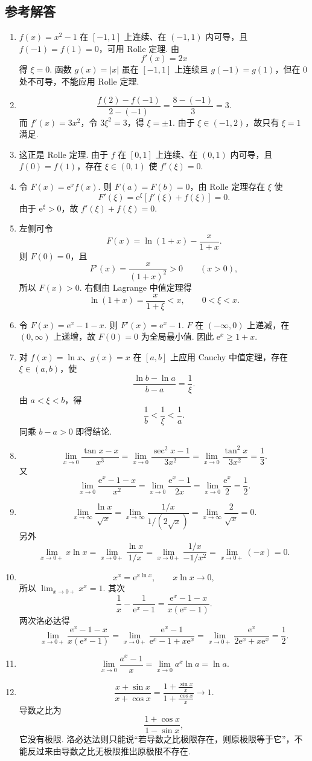 \documentclass[fontset=fandol]{ctexart}
\newcommand{\ee}{\mathrm{e}}
\begin{document}
\subsection{参考解答}
\begin{enumerate}[label=\textbf{练习\arabic*.},leftmargin=2.2em]
\item $f(x)=x^2-1$ 在 $[-1,1]$ 上连续、在 $(-1,1)$ 内可导，且 $f(-1)=f(1)=0$，可用 Rolle 定理. 由
\[
f'(x)=2x
\]
得 $\xi=0$. 函数 $g(x)=|x|$ 虽在 $[-1,1]$ 上连续且 $g(-1)=g(1)$，但在 $0$ 处不可导，不能应用 Rolle 定理.
\item
\[
\frac{f(2)-f(-1)}{2-(-1)}=\frac{8-(-1)}{3}=3.
\]
而 $f'(x)=3x^2$，令 $3\xi^2=3$，得 $\xi=\pm1$. 由于 $\xi\in(-1,2)$，故只有 $\xi=1$ 满足.
\item 这正是 Rolle 定理. 由于 $f$ 在 $[0,1]$ 上连续、在 $(0,1)$ 内可导，且 $f(0)=f(1)$，存在 $\xi\in(0,1)$ 使 $f'(\xi)=0$.
\item 令 $F(x)=\ee^x f(x)$. 则 $F(a)=F(b)=0$，由 Rolle 定理存在 $\xi$ 使
\[
F'(\xi)=\ee^\xi[f'(\xi)+f(\xi)]=0.
\]
由于 $\ee^\xi>0$，故 $f'(\xi)+f(\xi)=0$.
\item 左侧可令
\[
F(x)=\ln(1+x)-\frac{x}{1+x}.
\]
则 $F(0)=0$，且
\[
F'(x)=\frac{x}{(1+x)^2}>0\qquad(x>0),
\]
所以 $F(x)>0$. 右侧由 Lagrange 中值定理得
\[
\ln(1+x)=\frac{x}{1+\xi}<x,\qquad 0<\xi<x.
\]
\item 令 $F(x)=\ee^x-1-x$. 则 $F'(x)=\ee^x-1$. $F$ 在 $(-\infty,0)$ 上递减，在 $(0,\infty)$ 上递增，故 $F(0)=0$ 为全局最小值. 因此 $\ee^x\geq1+x$.
\item 对 $f(x)=\ln x$、$g(x)=x$ 在 $[a,b]$ 上应用 Cauchy 中值定理，存在 $\xi\in(a,b)$，使
\[
\frac{\ln b-\ln a}{b-a}=\frac1\xi.
\]
由 $a<\xi<b$，得
\[
\frac1b<\frac1\xi<\frac1a.
\]
同乘 $b-a>0$ 即得结论.
\item
\[
\lim_{x\to0}\frac{\tan x-x}{x^3}
=\lim_{x\to0}\frac{\sec^2x-1}{3x^2}
=\lim_{x\to0}\frac{\tan^2x}{3x^2}=\frac13.
\]
又
\[
\lim_{x\to0}\frac{\ee^x-1-x}{x^2}
=\lim_{x\to0}\frac{\ee^x-1}{2x}
=\lim_{x\to0}\frac{\ee^x}{2}=\frac12.
\]
\item
\[
\lim_{x\to\infty}\frac{\ln x}{\sqrt{x}}
=\lim_{x\to\infty}\frac{1/x}{1/(2\sqrt{x})}
=\lim_{x\to\infty}\frac{2}{\sqrt{x}}=0.
\]
另外
\[
\lim_{x\to0+}x\ln x
=\lim_{x\to0+}\frac{\ln x}{1/x}
=\lim_{x\to0+}\frac{1/x}{-1/x^2}
=\lim_{x\to0+}(-x)=0.
\]
\item
\[
x^x=\ee^{x\ln x},\qquad x\ln x\to0,
\]
所以 $\lim_{x\to0+}x^x=1$. 其次
\[
\frac1x-\frac1{\ee^x-1}
=\frac{\ee^x-1-x}{x(\ee^x-1)}.
\]
两次洛必达得
\[
\lim_{x\to0+}\frac{\ee^x-1-x}{x(\ee^x-1)}
=\lim_{x\to0+}\frac{\ee^x-1}{\ee^x-1+x\ee^x}
=\lim_{x\to0+}\frac{\ee^x}{2\ee^x+x\ee^x}
=\frac12.
\]
\item
\[
\lim_{x\to0}\frac{a^x-1}{x}
=\lim_{x\to0}a^x\ln a=\ln a.
\]
\item
\[
\frac{x+\sin x}{x+\cos x}
=\frac{1+\frac{\sin x}{x}}{1+\frac{\cos x}{x}}\to1.
\]
导数之比为
\[
\frac{1+\cos x}{1-\sin x},
\]
它没有极限. 洛必达法则只能说“若导数之比极限存在，则原极限等于它”，不能反过来由导数之比无极限推出原极限不存在.
\end{enumerate}
\end{document}
